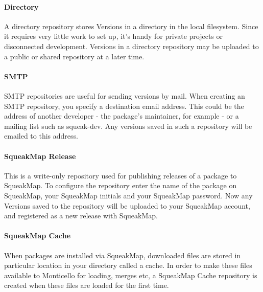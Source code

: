 \documentclass[a4paper,10pt,twoside]{book}
\begin{document}
\paragraph{Directory} A directory repository stores Versions in a directory in the local filesystem. Since it requires very little work to set up, it's handy for private projects or disconnected development. Versions in a directory repository may be uploaded to a public or shared repository at a later time.

\paragraph{SMTP} SMTP repositories are useful for sending versions by mail. When creating an SMTP repository, you specify a destination email address. This could be the address of another developer - the package's maintainer, for example - or a mailing list such as squeak-dev. Any versions saved in such a repository will be emailed to this address.

\paragraph{SqueakMap Release} This is a write-only repository used for publishing releases of a package to SqueakMap. To configure the repository enter the name of the package on SqueakMap, your SqueakMap initials and your SqueakMap password. Now any Versions saved to the repository will be uploaded to your SqueakMap account, and registered as a new release with SqueakMap.

\paragraph{SqueakMap Cache} When packages are installed via SqueakMap, downloaded files are stored in particular location in your directory called a cache. In order to make these files available to Monticello for loading, merges etc, a SqueakMap Cache repository is created when these files are loaded for the first time.


\end{document}
